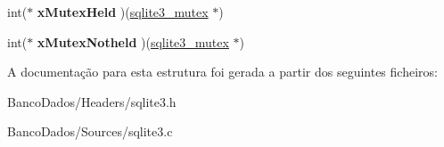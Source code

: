 \begin{DoxyCompactItemize}
\item 
\hypertarget{structsqlite3__mutex__methods_a5d30a95c614bc08fe156c9ea0f0d88e8}{int($\ast$ {\bfseries x\-Mutex\-Held} )(\hyperlink{structsqlite3__mutex}{sqlite3\-\_\-mutex} $\ast$)}\label{structsqlite3__mutex__methods_a5d30a95c614bc08fe156c9ea0f0d88e8}

\item 
\hypertarget{structsqlite3__mutex__methods_a7bc1edfd01c67c6dcee26299bc31a7bf}{int($\ast$ {\bfseries x\-Mutex\-Notheld} )(\hyperlink{structsqlite3__mutex}{sqlite3\-\_\-mutex} $\ast$)}\label{structsqlite3__mutex__methods_a7bc1edfd01c67c6dcee26299bc31a7bf}

\end{DoxyCompactItemize}


A documentação para esta estrutura foi gerada a partir dos seguintes ficheiros\-:\begin{DoxyCompactItemize}
\item 
Banco\-Dados/\-Headers/sqlite3.\-h\item 
Banco\-Dados/\-Sources/sqlite3.\-c\end{DoxyCompactItemize}
